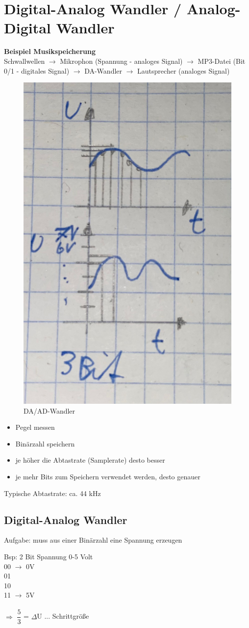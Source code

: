 \chapter{Digital-Analog Wandler / Analog-Digital Wandler}
\textbf{Beispiel Musikspeicherung} \\
Schwallwellen $\rightarrow$ Mikrophon (Spannung - analoges Signal) $\rightarrow$ MP3-Datei (Bit 0/1 - digitales Signal) $\rightarrow$ DA-Wandler $\rightarrow$ Lautsprecher (analoges Signal)

\begin{figure}[H]
	\centering
	\includegraphics[width=0.2\linewidth]{figures/daad1.jpeg}
	\caption{DA/AD-Wandler}
\end{figure}

\begin{itemize}
	\item Pegel messen
	\item Binärzahl speichern
	\item je höher die Abtastrate (Samplerate) desto besser
	\item je mehr Bits zum Speichern verwendet werden, desto genauer
\end{itemize}
Typische Abtastrate: ca. 44 kHz

\section{Digital-Analog Wandler}
Aufgabe: muss aus einer Binärzahl eine Spannung erzeugen

Bsp: 2 Bit Spannung 0-5 Volt \\
00 $\rightarrow$ 0V \\
01 \\
10 \\
11 $\rightarrow$ 5V \\ \\
$\Rightarrow$ $\dfrac{5}{3}$ = $\Delta$U ... Schrittgröße
\begin{center}
\end{center}

